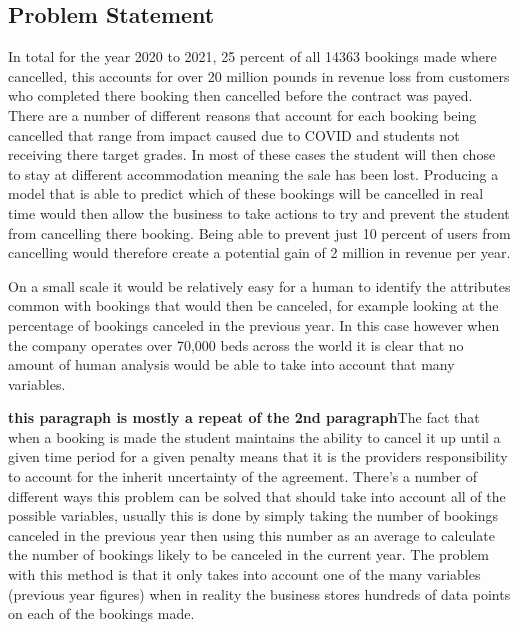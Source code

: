 \subsection{Problem Statement}

In total for the year 2020 to 2021, 25 percent of all 14363 bookings made where cancelled, this accounts for over 20 million pounds in revenue loss from customers who completed there booking then cancelled before the contract was payed. There are a number of different reasons that account for each booking being cancelled that range from impact caused due to COVID and students not receiving there target grades. In most of these cases the student will then chose to stay at different accommodation meaning the sale has been lost. Producing a model that is able to predict which of these bookings will be cancelled in real time would then allow the business to take actions to try and prevent the student from cancelling there booking. Being able to prevent just 10 percent of users from cancelling would therefore create a potential gain of 2 million in revenue per year.  

\vspace{5mm}

On a small scale it would be relatively easy for a human to identify the attributes common with bookings that would then be canceled, for example looking at the percentage of bookings canceled in the previous year. In this case however when the company operates over 70,000 beds across the world it is clear that no amount of human analysis would be able to take into account that many variables. 

\vspace{5mm}

\textbf{this paragraph is mostly a repeat of the 2nd paragraph}The fact that when a booking is made the student maintains the ability to cancel it up until a given time period for a given penalty means that it is the providers responsibility to account for the inherit uncertainty of the agreement. There's a number of different ways this problem can be solved that should take into account all of the possible variables, usually this is done by simply taking the number of bookings canceled in the previous year then using this number as an average to calculate the number of bookings likely to be canceled in the current year. The problem with this method is that it only takes into account one of the many variables (previous year figures) when in reality the business stores hundreds of data points on each of the bookings made.

